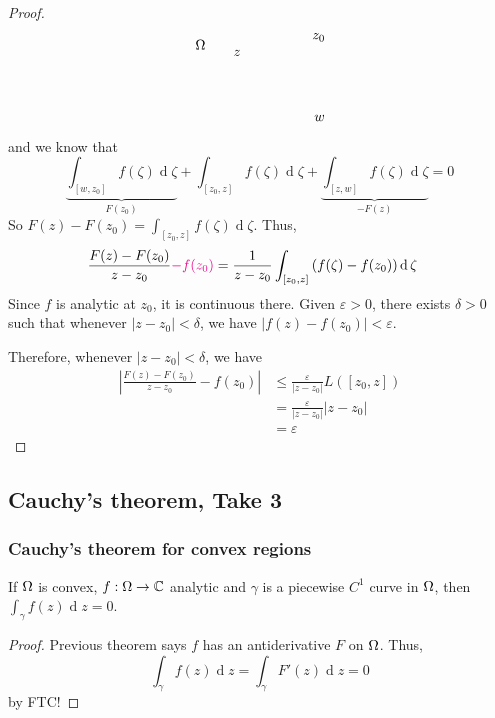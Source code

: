 \documentclass[12pt]{article}
\renewcommand{\d}{\ensuremath{\operatorname{d}}}
\begin{document}
\begin{proof}
\[\begin{tikzpicture}[x=0.75pt,y=0.75pt,yscale=-1,xscale=1]
        \draw (94,117.4) node [anchor=north west][inner sep=0.75pt]    {$\Omega $};
        \draw (130,127.07) node [anchor=north west][inner sep=0.75pt]    {$z$};
        \draw (204.67,111.07) node [anchor=north west][inner sep=0.75pt]    {$z_{0}$};
        \draw (206.59,189.08) node [anchor=north west][inner sep=0.75pt]    {$w$};
        
        
        \end{tikzpicture}
        \]
        and we know that \[\underset{F(z_0)}{\underbrace{\int_{[w,z_0]}f(\zeta)\d \zeta}} + \int_{[z_0,z]}f(\zeta)\d \zeta + \underset{-F(z)}{\underbrace{\int_{[z,w]}f(\zeta)\d \zeta}}=0\]
        So $F(z)-F(z_0)=\int_{[z_0,z]}f(\zeta)\d \zeta$. Thus,
        \begin{align*}
            \frac{F(z)-F(z_0)}{z-z_0}\rt{-f(z_0)} &= \frac{1}{z-z_0}\int_{[z_0,z]}\left(f(\zeta)-f(z_0)\right)\d \zeta
        \end{align*}
        Since $f$ is analytic at $z_0$, it is continuous there. Given $\varepsilon>0$, there exists $\delta>0$ such that whenever $|z-z_0|<\delta$, we have  \(\left|f(z)-f(z_0)\right|<{\varepsilon}\).

        Therefore, whenever $|z-z_0|<\delta$, we have \sidenote{still by \(\left|\int_\gamma g(z)\d z\right|\leq \sup_{z\in \gamma}|g(z)|\cdot L(\gamma)\)}\begin{align*}
            \left|\frac{F(z)-F(z_0)}{z-z_0}-f(z_0)\right| &\leq \frac{\varepsilon}{|z-z_0|}L([z_0,z])\\
            &= \frac{\varepsilon}{|z-z_0|}|z-z_0|\\
            &= \varepsilon
        \end{align*}
\end{proof}

\subsection{Cauchy's theorem, Take 3}
\subsubsection{Cauchy's theorem for convex regions}
\begin{theorem}
    If $\Omega$ is convex, $f:\Omega\to \mathbb{C}$ analytic and $\gamma$ is a piecewise $C^1$ curve in $\Omega$, then $\int_{\gamma}f(z)\d z=0$.
\end{theorem}
\begin{proof}
    Previous theorem says $f$ has an antiderivative $F$ on $\Omega$. Thus, \[\int_{\gamma}f(z)\d z = \int_{\gamma}F'(z)\d z=0\] by FTC!
\end{proof}
\end{document}
